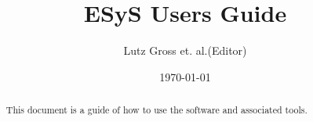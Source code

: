 \documentclass{manual}
\title{ESyS Users Guide}
\author{Lutz Gross et. al.(Editor)}
\date{\today}
\begin{document}
\maketitle



\begin{abstract}
This document is a guide of how to use the \ESyS software and
associated tools.
\end{abstract}

\tableofcontents









%



\makemodindex

\printindex
%



\end{document}

